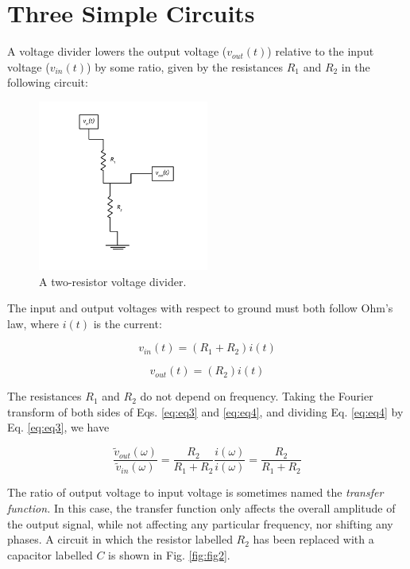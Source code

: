 \documentclass[12pt]{article}
\begin{document}
\section{Three Simple Circuits}

A voltage divider lowers the output voltage ($v_{out}(t)$) relative to the input voltage ($v_{in}(t)$) by some ratio, given by the resistances $R_1$ and $R_2$ in the following circuit:

\begin{figure}
\centering
\includegraphics[width=0.5\textwidth,trim=0cm 1cm 0cm 0cm,clip=true]{VoltageDivider.pdf}
\caption{\label{fig:fig1} A two-resistor voltage divider.}
\end{figure}

The input and output voltages with respect to ground must both follow Ohm's law, where $i(t)$ is the current:

\begin{equation}
v_{in} (t) = (R_1 + R_2)i(t)
\label{eq:eq3}
\end{equation}

\begin{equation}
v_{out} (t) = (R_2)i(t)
\label{eq:eq4}
\end{equation}

The resistances $R_1$ and $R_2$ do not depend on frequency.  Taking the Fourier transform of both sides of Eqs. \ref{eq:eq3} and \ref{eq:eq4}, and dividing Eq. \ref{eq:eq4} by Eq. \ref{eq:eq3}, we have

\begin{equation}
\boxed{
\frac{\tilde{v}_{out}(\omega)}{\tilde{v}_{in}(\omega)} = \frac{R_2}{R_1+R_2} \frac{i(\omega)}{i(\omega)} = \frac{R_2}{R_1+R_2}
}
\label{eq:trans1}
\end{equation}

The ratio of output voltage to input voltage is sometimes named the \textit{transfer function.}  In this case, the transfer function only affects the overall amplitude of the output signal, while not affecting any particular frequency, nor shifting any phases.  A circuit in which the resistor labelled $R_2$ has been replaced with a capacitor labelled $C$ is shown in Fig. \ref{fig:fig2}.
\end{document}
